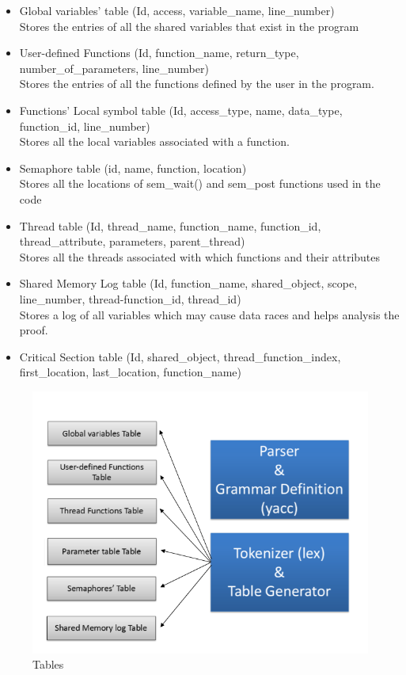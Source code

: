 \begin{itemize}
\item Global variables’ table (Id, access, variable\_name, line\_number)\\
Stores the entries of all the shared variables that exist in the program

\item User-defined Functions (Id, function\_name, return\_type, number\_of\_parameters, line\_number)\\
Stores the entries of all the functions defined by the user in the program.

\item Functions’ Local symbol table (Id, access\_type, name, data\_type, function\_id, line\_number)\\
Stores all the local variables associated with a function.

\item Semaphore table (id, name, function, location)\\
Stores all the locations of sem\_wait() and sem\_post functions used in the code

\item Thread table (Id, thread\_name, function\_name, function\_id, thread\_attribute, parameters, parent\_thread)\\
Stores all the threads associated with which functions and their attributes

\item Shared Memory Log table (Id, function\_name, shared\_object, scope, line\_number, thread-function\_id, thread\_id)\\
Stores a log of all variables which may cause data races and helps analysis the proof.

\item Critical Section table (Id, shared\_object, thread\_function\_index, first\_location, last\_location, function\_name)

\end{itemize}
\begin{figure}[H]
\centering
\includegraphics[scale=0.5]{tables.png}
\caption{Tables}
\label{<<Label>>}
\end{figure}

